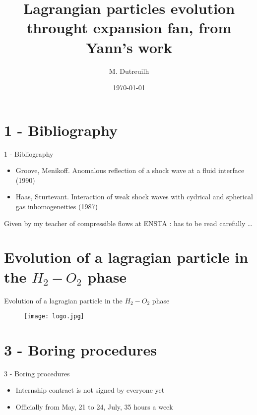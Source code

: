 \documentclass{beamer}
\title[Shock wave refraction]{Lagrangian particles evolution throught expansion fan, from Yann's work}
\author{M. Dutreuilh}
\institute{Tsinghua University}
\date{\today}
\begin{document}
\begin{frame}
  \titlepage
\end{frame}


\section{1 - Bibliography}

\begin{frame}{1 - Bibliography}

\begin{itemize}
  \item Groove, Menikoff. Anomalous reflection of a shock wave at a fluid interface (1990)
  \item Haas, Sturtevant. Interaction of weak shock waves with cydrical and spherical gas inhomogeneities (1987)
\end{itemize}

Given by my teacher of compressible flows at ENSTA : has to be read carefully \dots{}

\end{frame}

\section{Evolution of a lagragian particle in the $H_2-O_2$ phase}
\begin{frame}{Evolution of a lagragian particle in the $H_2-O_2$ phase}

\begin{figure}
    \centering
    \texttt{[image: logo.jpg]}
\end{figure}

\end{frame}

\section{3 - Boring procedures}

\begin{frame}{3 - Boring procedures}

\begin{itemize}
\item Internship contract is not signed by everyone yet 
\item Officially from May, 21 to 24, July, 35 hours a week
\end{itemize}

\end{frame}
\end{document}
